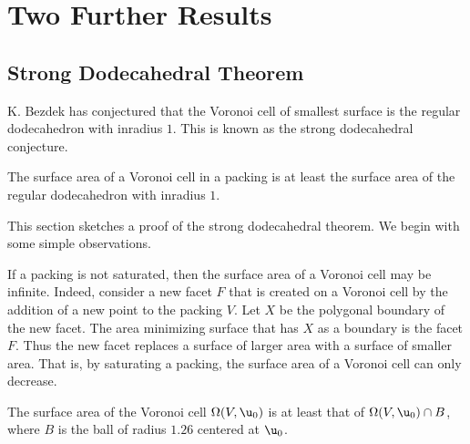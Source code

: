
\chapter{Two Further Results}


\section{Strong Dodecahedral Theorem}

K. Bezdek has conjectured that the Voronoi cell of smallest surface is
the regular dodecahedron with inradius $1$.  This is known as the
strong dodecahedral conjecture.  
%
%


\begin{theorem}
The surface area of a Voronoi cell in a packing is at least the surface area of the regular dodecahedron
with inradius $1$.
\end{theorem}

This section sketches a proof of the strong dodecahedral theorem.    We begin with some
simple observations.

\begin{remark}
If a packing is not saturated, then the surface area of a Voronoi cell may be infinite.   Indeed,
consider a new facet $F$ that is created on a Voronoi cell 
by the addition of a new point to the packing $V$.
Let $X$ be the polygonal boundary of the new facet.  
The area minimizing surface that has $X$ as a boundary is the facet $F$.  Thus the new facet
replaces a surface of larger area with a surface of smaller area.
That is, by saturating a packing,
the surface area of a Voronoi cell can only decrease.  
\end{remark}


\begin{lemma}[]
The surface area of the Voronoi cell $\Omega(V, \u_0)$ is at least that
of $\Omega(V, \u_0)\cap B$, where
 $B$ is the ball of radius $1.26$ centered at $ \u_0$.
\end{lemma}
%
%

